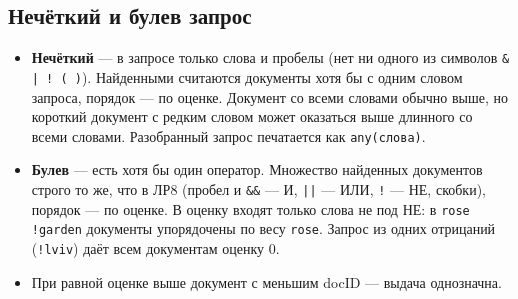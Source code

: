 \subsection{Нечёткий и булев запрос}
\begin{itemize}
    \item \textbf{Нечёткий} --- в запросе только слова и пробелы (нет ни одного из символов \texttt{\& | ! ( )}). Найденными считаются документы хотя бы с одним словом запроса, порядок --- по оценке. Документ со всеми словами обычно выше, но короткий документ с редким словом может оказаться выше длинного со всеми словами. Разобранный запрос печатается как \texttt{any(слова)}.
    \item \textbf{Булев} --- есть хотя бы один оператор. Множество найденных документов строго то же, что в ЛР8 (пробел и \texttt{\&\&} --- И, \texttt{||} --- ИЛИ, \texttt{!} --- НЕ, скобки), порядок --- по оценке. В оценку входят только слова не под НЕ: в \texttt{rose !garden} документы упорядочены по весу \texttt{rose}. Запрос из одних отрицаний (\texttt{!lviv}) даёт всем документам оценку 0.
    \item При равной оценке выше документ с меньшим docID --- выдача однозначна.
\end{itemize}


